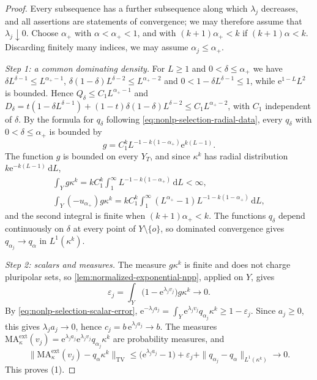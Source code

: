 \begin{proof}
Every subsequence has a further subsequence along which $\lambda_j$ decreases, and all assertions are statements of convergence; we may therefore assume that $\lambda_j\downarrow0$. Choose $\alpha_+$ with $\alpha<\alpha_+<1$, and with $(k+1)\alpha_+<k$ if $(k+1)\alpha<k$. Discarding finitely many indices, we may assume $\alpha_j\leq\alpha_+$.

\emph{Step 1: a common dominating density.} For $L\geq1$ and $0<\delta\leq\alpha_+$ we have $\delta L^{\delta-1}\leq L^{\alpha_+-1}$, $\delta(1-\delta)L^{\delta-2}\leq L^{\alpha_+-2}$ and $0<1-\delta L^{\delta-1}\leq1$, while $\mathrm{e}^{1-L}L^2$ is bounded. Hence $Q_\delta\leq C_1L^{\alpha_+-1}$ and $D_\delta=t(1-\delta L^{\delta-1})+(1-t)\delta(1-\delta)L^{\delta-2}\leq C_1L^{\alpha_+-2}$, with $C_1$ independent of $\delta$. By the formula for $q_\delta$ following \eqref{eq:nonlp-selection-radial-data}, every $q_\delta$ with $0<\delta\leq\alpha_+$ is bounded by
\[
 g=C_1^kL^{-1-k(1-\alpha_+)}\mathrm{e}^{k(L-1)}.
\]
The function $g$ is bounded on every $Y_T$, and since $\kappa^k$ has radial distribution $k\mathrm{e}^{-k(L-1)}\,\mathrm{d}L$,
\begin{gather*}
 \int_Yg\kappa^k=kC_1^k\int_1^\infty L^{-1-k(1-\alpha_+)}\,\mathrm{d}L<\infty,\\
 \int_Y(-u_{\alpha_+})g\kappa^k=kC_1^k\int_1^\infty(L^{\alpha_+}-1)L^{-1-k(1-\alpha_+)}\,\mathrm{d}L,
\end{gather*}
and the second integral is finite when $(k+1)\alpha_+<k$. The functions $q_\delta$ depend continuously on $\delta$ at every point of $Y\setminus\{o\}$, so dominated convergence gives $q_{\alpha_j}\to q_\alpha$ in $L^1(\kappa^k)$.

\emph{Step 2: scalars and measures.} The measure $g\kappa^k$ is finite and does not charge pluripolar sets, so \cref{lem:normalized-exponential-npp}, applied on $Y$, gives
\[
 \varepsilon_j=\int_Y\bigl(1-\mathrm{e}^{\lambda_jv_j}\bigr)g\kappa^k\longrightarrow0.
\]
By \eqref{eq:nonlp-selection-scalar-error}, $\mathrm{e}^{-\lambda_ja_j}=\int_Y\mathrm{e}^{\lambda_jv_j}q_{\alpha_j}\kappa^k\geq1-\varepsilon_j$. Since $a_j\geq0$, this gives $\lambda_ja_j\to0$, hence $c_j=b\,\mathrm{e}^{\lambda_ja_j}\to b$. The measures $\mathrm{MA}^{\mathrm{ext}}_\kappa(v_j)=\mathrm{e}^{\lambda_ja_j}\mathrm{e}^{\lambda_jv_j}q_{\alpha_j}\kappa^k$ are probability measures, and
\[
 \bigl\|\mathrm{MA}^{\mathrm{ext}}_\kappa(v_j)-q_\alpha\kappa^k\bigr\|_{\mathrm{TV}}
 \leq\bigl(\mathrm{e}^{\lambda_ja_j}-1\bigr)+\varepsilon_j+\|q_{\alpha_j}-q_\alpha\|_{L^1(\kappa^k)}
 \longrightarrow0.
\]
This proves (1).


\end{proof}
